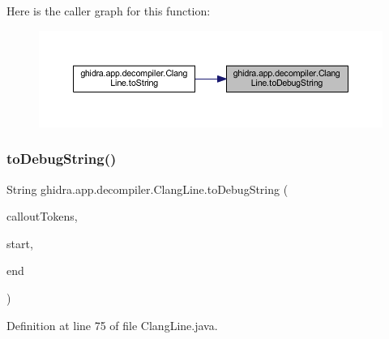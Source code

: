 Here is the caller graph for this function\+:
\nopagebreak
\begin{figure}[H]
\begin{center}
\leavevmode
\includegraphics[width=350pt]{classghidra_1_1app_1_1decompiler_1_1_clang_line_a5260eb1f0f2447f123342cade62978c2_icgraph}
\end{center}
\end{figure}
\mbox{\label{classghidra_1_1app_1_1decompiler_1_1_clang_line_a435789509abf36e99f0295ebba666853}} 
\subsubsection{\texorpdfstring{toDebugString()}{toDebugString()}\hspace{0.1cm}{\footnotesize\ttfamily [2/2]}}
{\footnotesize\ttfamily String ghidra.\+app.\+decompiler.\+Clang\+Line.\+to\+Debug\+String (\begin{DoxyParamCaption}\item[{\mbox{\hyperlink{xml_8hh_ab5ab62f46b3735557c125f91b40ac155}{List}}$<$ \mbox{\hyperlink{classghidra_1_1app_1_1decompiler_1_1_clang_token}{Clang\+Token}} $>$}]{callout\+Tokens,  }\item[{String}]{start,  }\item[{String}]{end }\end{DoxyParamCaption})\hspace{0.3cm}{\ttfamily [inline]}}



Definition at line 75 of file Clang\+Line.\+java.

